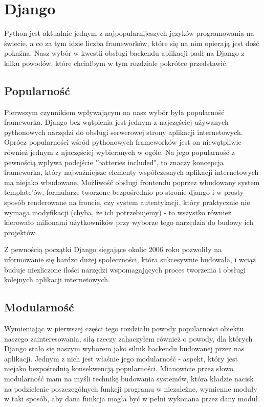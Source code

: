 \chapter{Django}

Python jest aktualnie jednym z najpopularnijeszych języków programowania na świecie, a co za tym idzie liczba frameworków, które się na nim opierają jest dość pokaźna. Nasz wybór w kwestii obsługi backendu aplikacji padł na Django z kilku powodów, które chciałbym w tym rozdziale pokrótce przedstawić. 

\section{Popularność}
Pierwszym czynnikiem wpływającym na nasz wybór była popularność frameworka. Django bez wątpienia jest jednym z najczęściej używanych pythonowych narzędzi do obsługi serwerowej strony aplikacji internetowych. Oprócz popularności wśród pythonowych frameworków jest on niewątpliwie również jednym z njaczęściej wybieranych w ogóle. Na jego popularność z pewnością wpływa podejście "batteries included", to znaczy koncepcja frameworka, który najważniejsze elementy współczesnych aplikacji internetowych ma niejako wbudowane. Możliwość obsługi frontendu poprzez wbudowany system template'ów, formularze tworzone bezpośrednio po stronie django i w prosty sposób renderowane na froncie, czy system autentykacji, który praktycznie nie wymaga modyfikacji (chyba, że ich potrzebujemy) - to wszystko również kierowało milionami użytkowników przy wyborze tego narzędzia do budowy ich projektów. 

Z pewnością początki Django sięgające okolic 2006 roku pozwoliły na uformowanie się bardzo dużej społeczności, która sukcesywnie budowała, i wciąż buduje niezliczone ilości narzędzi wspomagających proces tworzenia i obsługi kolejnych aplikacji internetowych.

\section{Modularność}
Wymieniając w pierwszej części tego rozdziału powody popularności obiektu naszego zainteresowania, siłą rzeczy zahaczyłem również o powody, dla których Django stało się naszym wyborem jako silnik backendu budowanej przez nas aplikacji. Jednym z nich jest właśnie jego modularność - aspekt, który jest niejako bezpośrednią konsekwencją popularności. Mianowicie przez słowo modularność mam na myśli technikę budowania systemów, która kładzie nacisk na podzielenie poszczególnych funkcji programu w niezależne, wymienne moduły w taki sposób, aby dana funkcja mogła być w pełni wykonana przez dany moduł.

